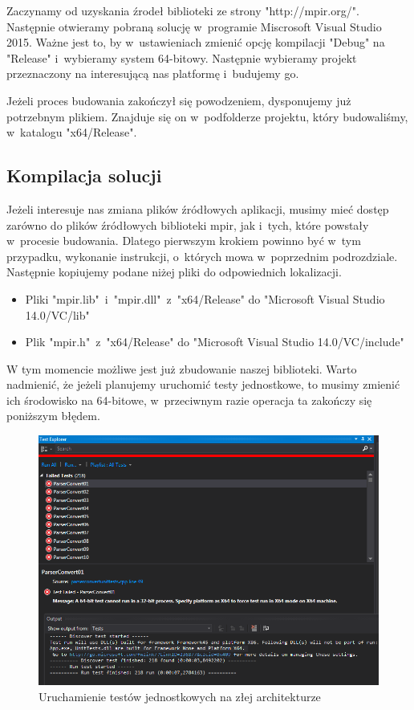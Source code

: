 Zaczynamy od uzyskania źrodeł biblioteki ze strony "http://mpir.org/". Następnie otwieramy pobraną solucję w~programie Miscrosoft Visual Studio 2015. Ważne jest to, by w~ustawieniach zmienić opcję kompilacji "Debug" na "Release" i~wybieramy system 64-bitowy. Następnie wybieramy projekt przeznaczony na interesującą nas platformę i~budujemy go.

Jeżeli proces budowania zakończył się powodzeniem, dysponujemy już potrzebnym plikiem. Znajduje się on w~podfolderze projektu, który budowaliśmy, w~katalogu "x64/Release".

\subsection{Kompilacja solucji}

Jeżeli interesuje nas zmiana plików źródłowych aplikacji, musimy mieć dostęp zarówno do plików źródłowych biblioteki mpir, jak i~tych, które powstały w~procesie budowania. Dlatego pierwszym krokiem powinno być w~tym przypadku, wykonanie instrukcji, o~których mowa w~poprzednim podrozdziale. Następnie kopiujemy podane niżej pliki do odpowiednich lokalizacji.

\begin{itemize}
	\item Pliki "mpir.lib"\ i~"mpir.dll"\ z~"x64/Release" do "Microsoft Visual Studio 14.0/VC/lib"
	\item Plik "mpir.h"\ z~"x64/Release" do "Microsoft Visual Studio 14.0/VC/include"
\end{itemize}

W tym momencie możliwe jest już zbudowanie naszej biblioteki. Warto nadmienić, że jeżeli planujemy uruchomić testy jednostkowe, to musimy zmienić ich środowisko na 64-bitowe, w~przeciwnym razie operacja ta zakończy się poniższym błędem.

\begin{figure}[H]
	\includegraphics[width=15cm]{img/UnitTests_wrong_architecture.png}
	\caption{Uruchamienie testów jednostkowych na złej architekturze}
\end{figure}

